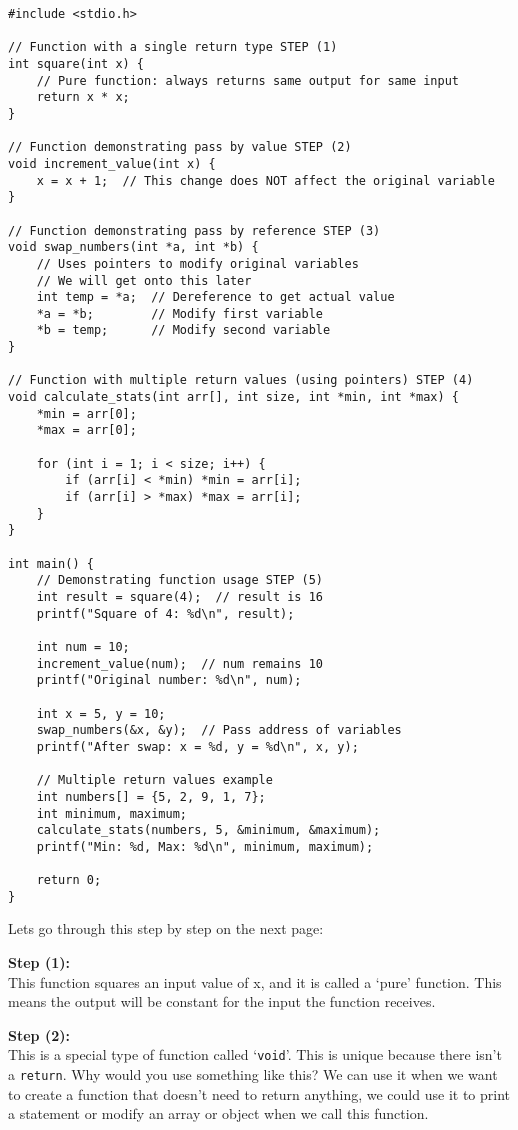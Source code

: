 \documentclass[a4paper,12pt]{article}
\begin{document}
\lstset{language=C}
\begin{lstlisting}[caption=Function example]
#include <stdio.h>
    
// Function with a single return type STEP (1)
int square(int x) {
    // Pure function: always returns same output for same input
    return x * x;
}

// Function demonstrating pass by value STEP (2)
void increment_value(int x) {
    x = x + 1;  // This change does NOT affect the original variable
}

// Function demonstrating pass by reference STEP (3)
void swap_numbers(int *a, int *b) {
    // Uses pointers to modify original variables
    // We will get onto this later
    int temp = *a;  // Dereference to get actual value
    *a = *b;        // Modify first variable
    *b = temp;      // Modify second variable
}

// Function with multiple return values (using pointers) STEP (4)
void calculate_stats(int arr[], int size, int *min, int *max) {
    *min = arr[0];
    *max = arr[0];
    
    for (int i = 1; i < size; i++) {
        if (arr[i] < *min) *min = arr[i];
        if (arr[i] > *max) *max = arr[i];
    }
}

int main() {
    // Demonstrating function usage STEP (5)
    int result = square(4);  // result is 16
    printf("Square of 4: %d\n", result);
    
    int num = 10;
    increment_value(num);  // num remains 10
    printf("Original number: %d\n", num);
    
    int x = 5, y = 10;
    swap_numbers(&x, &y);  // Pass address of variables
    printf("After swap: x = %d, y = %d\n", x, y);
    
    // Multiple return values example
    int numbers[] = {5, 2, 9, 1, 7};
    int minimum, maximum;
    calculate_stats(numbers, 5, &minimum, &maximum);
    printf("Min: %d, Max: %d\n", minimum, maximum);
    
    return 0;
}\end{lstlisting}

Lets go through this step by step on the next page:

\textbf{Step (1):}\\
This function squares an input value of x, and it is called a `pure' function. This means the output will be constant for the input the function receives. 

\textbf{Step (2):}\\
This is a special type of function called `\verb|void|'. This is unique because there isn't a \verb|return|. Why would you use something like this? We can use it when we want to create a function that doesn't need to return anything, we could use it to print a statement or modify an array or object when we call this function.
\end{document}
